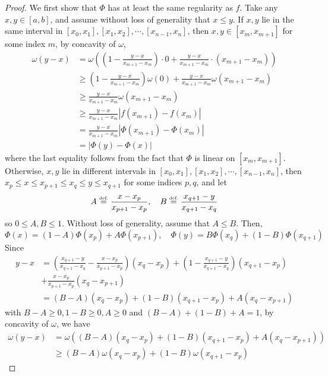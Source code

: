 \documentclass{article}
\numberwithin{equation}{section}
\theoremstyle{definition}
\newcommand{\eqdef}{\ensuremath{\stackrel{\mbox{\upshape\tiny def.}}{=}}}
\begin{document}
\begin{proof}

We first show that $\Phi$ has at least the same regularity as $f$. Take any $x,y\in[a,b]$, and assume without loss of generality that $x\le y$. If $x,y$ lie in the same interval in $[x_0,x_1],[x_1,x_2],\cdots,[x_{n-1},x_n]$, then $x,y\in[x_m,x_{m+1}]$ for some index $m$, by concavity of $\omega$, 
\begin{align*}
    \omega(y-x) 
    &= 
    \omega\left(
        \left( 1 - \frac{y-x}{x_{m+1}-x_m} \right) \cdot 0
        +
        \frac{y-x}{x_{m+1}-x_m} \cdot (x_{m+1}-x_m)
    \right)
    \\ 
    &\ge 
    \left( 1 - \frac{y-x}{x_{m+1}-x_m} \right) \omega(0)
    +
    \frac{y-x}{x_{m+1}-x_m} \omega(x_{m+1}-x_m)
    \\
    &\ge 
    \frac{y-x}{x_{m+1}-x_m} \omega(x_{m+1}-x_m)
    \\
    &\ge 
    \frac{y-x}{x_{m+1}-x_m} | f(x_{m+1}) - f(x_m) |
    \\
    &= 
    \frac{y-x}{x_{m+1}-x_m} | \Phi(x_{m+1}) - \Phi(x_m) |
    \\
    &=
    | \Phi(y) - \Phi(x) |
\end{align*}
where the last equality follows from the fact that $\Phi$ is linear on $[x_m,x_{m+1}]$. Otherwise, $x,y$ lie in different intervals in $[x_0,x_1],[x_1,x_2],\cdots,[x_{n-1},x_n]$, then $x_p \le x \le x_{p+1} \le x_q \le y \le x_{q+1}$ for some indices $p,q$, and let 
$$A \eqdef \frac{x-x_p}{x_{p+1}-x_p}, \quad
B \eqdef \frac{x_{q+1}-y}{x_{q+1}-x_q}$$
so $0 \le A,B \le 1$. Without loss of generality, assume that $A\le B$. Then, 
$$\Phi(x) = (1-A) \Phi(x_p) + A \Phi(x_{p+1}), \quad
  \Phi(y) = B \Phi(x_q) + (1-B) \Phi(x_{q+1})$$
Since 
\begin{align*}
    y-x
    &=
    \left(\frac{x_{q+1}-y}{x_{q+1}-x_q} - \frac{x-x_p}{x_{p+1}-x_p}\right)
    (x_q-x_p)
    + \left(1-\frac{x_{q+1}-y}{x_{q+1}-x_q}\right)
    (x_{q+1}-x_p)  \\
    &+ \frac{x-x_p}{x_{p+1}-x_p}(x_q - x_{p+1})  \\
    &= (B-A)(x_q-x_p) + (1-B)(x_{q+1}-x_p) + A(x_q - x_{p+1})
\end{align*}
with $B-A\ge 0, 1-B\ge 0, A\ge 0$ and $(B-A)+(1-B)+A=1$, by concavity of $\omega$, we have 
\begin{align*}
    \omega(y-x) 
    &= \omega( (B-A)(x_q-x_p) + (1-B)(x_{q+1}-x_p) + A(x_q - x_{p+1}) )  \\
    &\ge (B-A) \omega(x_q-x_p)
    + (1-B) \omega (x_{q+1}-x_p)

\end{align*}
\end{proof}
\end{document}
